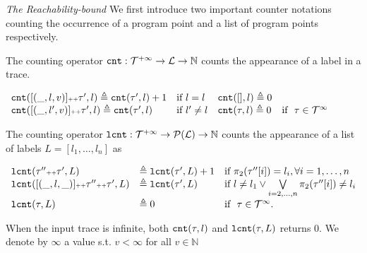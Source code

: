 \emph{The Reachability-bound}
We first introduce two important counter notations counting the occurrence of a program point and a list of program points respectively.
\begin{defn}
 \label{def:counter}
The counting operator $\mathtt{cnt} : \mathcal{T}^{+\infty} \to \mathcal{L} \to \mathbb{N}$
counts the appearance of a label in a trace.
\begin{center}
{\small
$
\begin{array}{llll}
\mathtt{cnt}([(\_, l, v)] {\scriptscriptstyle ++} \mathtt{\tau}', l ) \triangleq \mathtt{cnt}(\mathtt{\tau}', l) + 1 & \text{if}~ l = l
&
\mathtt{cnt}({[]}, l) \triangleq 0 & 
\\
\mathtt{cnt}([(\_, l', v)] {\scriptscriptstyle ++} \mathtt{\tau}', l) \triangleq \mathtt{cnt}(\mathtt{\tau}', l) & \text{if}~ l' \neq l
&
\mathtt{cnt}(\mathtt{\tau}, l) \triangleq 0 & \text{if }~ \mathtt{\tau} \in \mathcal{T}^{\infty}
\end{array}
$
}
\end{center}
\end{defn}
\begin{defn}
 \label{def:lcounter}
 The counting operator $\mathtt{lcnt} : \mathcal{T}^{+\infty} \to \mathcal{P}(\mathcal{L}) \to \mathbb{N}$
 counts the appearance of a list of labels $L = [l_1, \ldots, l_n]$ as
{\small
\begin{center}
 $
 \begin{array}{lll}
 \mathtt{lcnt}(\mathtt{\tau}'' {\scriptscriptstyle ++} \mathtt{\tau}', L ) 
 & \triangleq \mathtt{lcnt}(\mathtt{\tau}', L) + 1 & \text{if}~ \pi_2(\mathtt{\tau}''[i]) = l_i, \forall i = 1, \ldots, n
 \\ 
 \mathtt{lcnt}([(\_, l, \_)] {\scriptscriptstyle ++} \mathtt{\tau}'' {\scriptscriptstyle ++} \mathtt{\tau}', L ) 
 & \triangleq \mathtt{lcnt}(\mathtt{\tau}', L) & \text{if}~ l \neq l_1 \lor \bigvee\limits_{i = 2, \ldots, n} \pi_2(\mathtt{\tau}''[i]) \neq l_i
 \\ 
 \mathtt{lcnt}(\mathtt{\tau}, L ) 
 & \triangleq 0 & \text{if }~ \mathtt{\tau} \in \mathcal{T}^{\infty}.
 \end{array}
 $
 \end{center}
 }
\end{defn}
%
When the input trace is infinite, both $\mathtt{cnt}(\mathtt{\tau}, l)$ and $\mathtt{lcnt}(\mathtt{\tau}, L)$ returns $0$.
We denote by $\infty$ a value s.t. $v < \infty $ for all $v \in \mathbb{N}$

